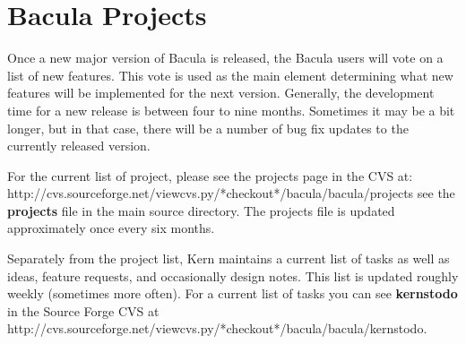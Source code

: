 
\chapter{Bacula Projects}
\label{ProjectsChapter}

Once a new major version of Bacula is released, the Bacula
users will vote on a list of new features. This vote is used
as the main element determining what new features will be  
implemented for the next version. Generally, the development time
for a new release is between four to nine months.  Sometimes it may be 
a bit longer, but in that case, there will be a number of bug fix
updates to the currently released version.

For the current list of project, please see the projects page in the CVS
at: 
{http://cvs.sourceforge.net/viewcvs.py/*checkout*/bacula/bacula/projects}
see the {\bf projects} file in the main source directory. The projects
file is updated approximately once every six months.    

Separately from the project list, Kern maintains a current list of
tasks as well as ideas, feature requests, and occasionally design
notes. This list is updated roughly weekly (sometimes more often).
For a current list of tasks you can see {\bf kernstodo} in the Source Forge
CVS at 
{http://cvs.sourceforge.net/viewcvs.py/*checkout*/bacula/bacula/kernstodo}.   
